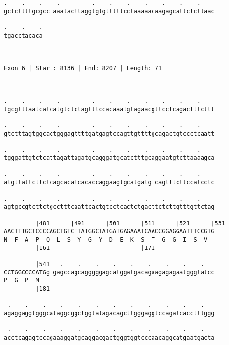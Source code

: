 \documentclass{article}
\begin{document}
\begin{Verbatim}
.    .    .    .    .    .    .    .    .    .    .    .    
gctcttttgcgcctaaatacttaggtgtgtttttcctaaaaacaagagcattctcttaac
                                                            
.    .    .
tgacctacaca
           
           
 
Exon 6 | Start: 8136 | End: 8207 | Length: 71



.    .    .    .    .    .    .    .    .    .    .    .    
tgcgtttaatcatcatgtctctagtttccacaaatgtagaacgttcctcagactttcttt
                                                            
.    .    .    .    .    .    .    .    .    .    .    .    
gtctttagtggcactgggagttttgatgagtccagttgttttgcagactgtccctcaatt
                                                            
.    .    .    .    .    .    .    .    .    .    .    .    
tgggattgtctcattagattagatgcagggatgcatctttgcaggaatgtcttaaaagca
                                                            
.    .    .    .    .    .    .    .    .    .    .    .    
atgttattcttctcagcacatcacaccaggaagtgcatgatgtcagtttcttccatcctc
                                                            
.    .    .    .    .    .    .    .    .    .    .    .    
agtgccgtcttctgcctttcaattcactgtcctcactctgacttctcttgtttgttctag
                                                            
         |481      |491      |501      |511      |521      |531
AACTTTGCTCCCCAGCTGTCTTATGGCTATGATGAGAAATCAACCGGAGGAATTTCCGTG
N  F  A  P  Q  L  S  Y  G  Y  D  E  K  S  T  G  G  I  S  V  
         |161                          |171                 
  
         |541   .    .    .    .    .    .    .    .    .   
CCTGGCCCCATGgtgagccagcagggggagcatggatgacagaagagagaatgggtatcc
P  G  P  M                                                  
         |181                                               
  
 .    .    .    .    .    .    .    .    .    .    .    .   
agaggaggtgggcataggcggctggtatagacagcttgggaggtccagatcacctttggg
                                                            
 .    .    .    .    .    .    .    .    .    .    .    .   
acctcagagtccagaaaggatgcaggacgactgggtggtcccaacaggcatgaatgacta
                                                            

\end{Verbatim}
\end{document}
